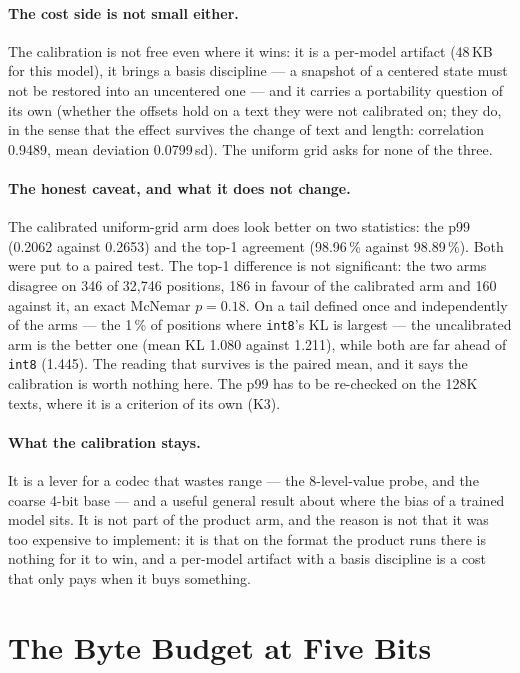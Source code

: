 \documentclass[10pt,twocolumn]{article}
\begin{document}
\paragraph{The cost side is not small either.} The calibration is not free even where it wins: it is a
per-model artifact (48\,KB for this model), it brings a basis discipline --- a snapshot of a centered state
must not be restored into an uncentered one --- and it carries a portability question of its own (whether the
offsets hold on a text they were not calibrated on; they do, in the sense that the effect survives the change
of text and length: correlation 0.9489, mean deviation 0.0799\,sd). The uniform grid asks for none of the
three.

\paragraph{The honest caveat, and what it does not change.} The calibrated uniform-grid arm does look better on
two statistics: the p99 (0.2062 against 0.2653) and the top-1 agreement (98.96\,\% against 98.89\,\%). Both
were put to a paired test. The top-1 difference is not significant: the two arms disagree on 346 of 32,746
positions, 186 in favour of the calibrated arm and 160 against it, an exact McNemar $p = 0.18$. On a tail
defined once and independently of the arms --- the 1\,\% of positions where \texttt{int8}'s KL is largest ---
the uncalibrated arm is the better one (mean KL 1.080 against 1.211), while both are far ahead of
\texttt{int8} (1.445). The reading that survives is the paired mean, and it says the calibration is worth
nothing here. The p99 has to be re-checked on the 128K texts, where it is a criterion of its own (K3).

\paragraph{What the calibration stays.} It is a lever for a codec that wastes range --- the 8-level-value
probe, and the coarse 4-bit base --- and a useful general result about where the bias of a trained model
sits. It is not part of the product arm, and the reason is not that it was too expensive to implement: it
is that on the format the product runs there is nothing for it to win, and a per-model artifact with a basis
discipline is a cost that only pays when it buys something.

\section{The Byte Budget at Five Bits}\label{sec:bytes}
\end{document}
